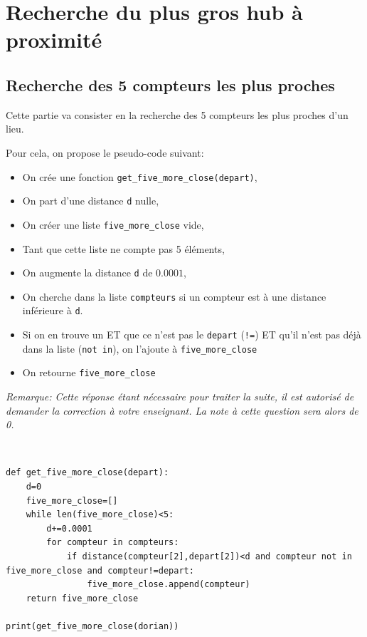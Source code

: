 \section{Recherche du plus gros hub à proximité}

\subsection{Recherche des 5 compteurs les plus proches}

Cette partie va consister en la recherche des 5 compteurs les plus proches d'un lieu.

Pour cela, on propose le pseudo-code suivant:
\begin{itemize}
 \item On crée une fonction \verb?get_five_more_close(depart)?,
 \item On part d'une distance \verb?d? nulle,
 \item On créer une liste \verb?five_more_close? vide,
 \item Tant que cette liste ne compte pas 5 éléments,
 \item On augmente la distance \verb?d? de $0.0001$,
 \item On cherche dans la liste \verb?compteurs? si un compteur est à une distance inférieure à \verb?d?.
 \item Si on en trouve un ET que ce n'est pas le \verb?depart? (\verb?!=?) ET qu'il n'est pas déjà dans la liste (\verb?not in?), on l'ajoute à \verb?five_more_close?
 \item On retourne \verb?five_more_close?
\end{itemize}


\textit{Remarque: Cette réponse étant nécessaire pour traiter la suite, il est autorisé de demander la correction à votre enseignant. La note à cette question sera alors de 0.}

\begin{solution}~\ \\
\begin{verbatim}
def get_five_more_close(depart):
    d=0
    five_more_close=[]
    while len(five_more_close)<5:
        d+=0.0001
        for compteur in compteurs:
            if distance(compteur[2],depart[2])<d and compteur not in five_more_close and compteur!=depart:
                five_more_close.append(compteur)
    return five_more_close

print(get_five_more_close(dorian))
\end{verbatim}
\end{solution}
  
